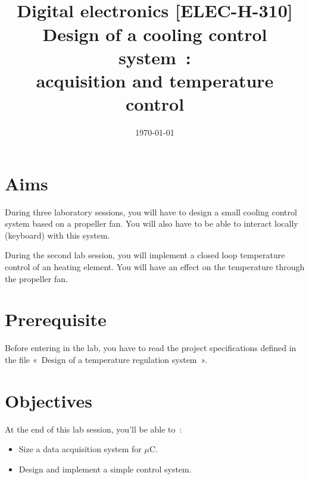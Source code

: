 \documentclass[11pt,a4paper]{article}
\date{\vspace{-1.7cm}\mydate\today}
\title{\vspace{-2cm}\labonumber \\ Digital electronics [ELEC-H-310]\\Design of a cooling control system~: \\ acquisition and temperature control\ifthenelse{\boolean{corrige}}{~\\Corrigé}{}}
\theoremstyle{definition}%
\begin{document}
\pagestyle{empty}
\maketitle





\section*{Aims}
During three laboratory sessions, you will have to design a small cooling control system based on a propeller fan.
You will also have to be able to interact locally (keyboard) with this system.

During the second lab session, you will implement a closed loop temperature control of an heating element.
You will have an effect on the temperature through the propeller fan.

\section*{Prerequisite}
Before entering in the lab, you have to read the project specifications defined in the file «~Design of a temperature regulation system~».


\section*{Objectives}
At the end of this lab session, you'll be able to~:
\begin{itemize}
	\item Size a data acquisition system for $\mu$C.
	\item Design and implement a simple control system.
\end{itemize}


\newpage




\end{document}
